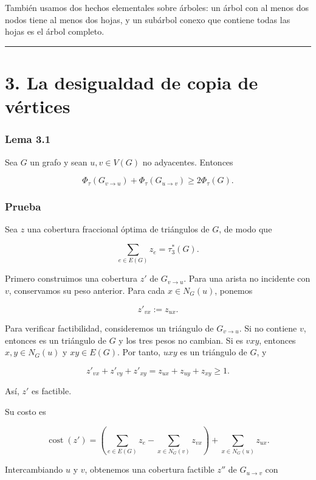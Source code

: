 \documentclass[
  11pt,
]{article}
\begin{document}
También usamos dos hechos elementales sobre árboles: un árbol con al
menos dos nodos tiene al menos dos hojas, y un subárbol conexo que
contiene todas las hojas es el árbol completo.

\begin{center}\rule{0.5\linewidth}{0.5pt}\end{center}

\section{3. La desigualdad de copia de
vértices}\label{la-desigualdad-de-copia-de-vuxe9rtices}

\subsubsection{Lema 3.1}\label{lema-3.1}

Sea \(G\) un grafo y sean \(u,v\in V(G)\) no adyacentes. Entonces

\[
\boxed{
\Phi_\tau(G_{v\to u})
+
\Phi_\tau(G_{u\to v})
\ge
2\Phi_\tau(G).
}
\]

\subsubsection{Prueba}\label{prueba-1}

Sea \(z\) una cobertura fraccional óptima de triángulos de \(G\), de
modo que

\[
\sum_{e\in E(G)}z_e=\tau_3^*(G).
\]

Primero construimos una cobertura \(z'\) de \(G_{v\to u}\). Para una
arista no incidente con \(v\), conservamos su peso anterior. Para cada
\(x\in N_G(u)\), ponemos

\[
z'_{vx}:=z_{ux}.
\]

Para verificar factibilidad, consideremos un triángulo de
\(G_{v\to u}\). Si no contiene \(v\), entonces es un triángulo de \(G\)
y los tres pesos no cambian. Si es \(vxy\), entonces \(x,y\in N_G(u)\) y
\(xy\in E(G)\). Por tanto, \(uxy\) es un triángulo de \(G\), y

\[
z'_{vx}+z'_{vy}+z'_{xy}
=
z_{ux}+z_{uy}+z_{xy}
\ge1.
\]

Así, \(z'\) es factible.

Su costo es

\[
\operatorname{cost}(z')
=
\left(
\sum_{e\in E(G)}z_e
-
\sum_{x\in N_G(v)}z_{vx}
\right)
+
\sum_{x\in N_G(u)}z_{ux}.
\tag{3.1}
\]

Intercambiando \(u\) y \(v\), obtenemos una cobertura factible \(z''\)
de \(G_{u\to v}\) con
\end{document}
